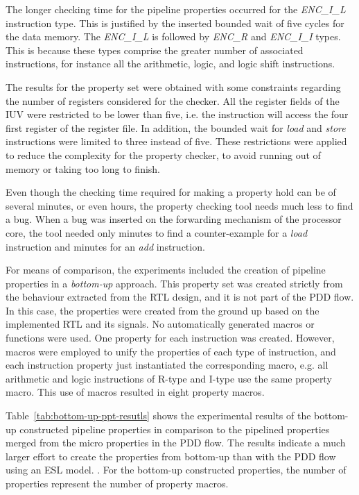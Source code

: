 The longer checking time for the pipeline properties occurred for the \textit{ENC\_I\_L} instruction type. This is justified by the inserted bounded wait of five cycles for the data memory. The \textit{ENC\_I\_L} is followed by \textit{ENC\_R} and \textit{ENC\_I\_I} types. This is because these types comprise the greater number of associated instructions, for instance all the arithmetic, logic, and logic shift instructions. 

The results for the \SSQED{} property set were obtained with some constraints regarding the number of registers considered for the checker. All the register fields of the IUV were restricted to be lower than five, i.e. the instruction will access the four first register of the register file. In addition, the bounded wait for \textit{load} and \textit{store} instructions were limited to three instead of five. These restrictions were applied to reduce the complexity for the property checker, to avoid running out of memory or taking too long to finish.

Even though the checking time required for making a property hold can be of several minutes, or even hours, the property checking tool needs much less to find a bug. When a bug was inserted on the forwarding mechanism of the processor core, the tool needed only  minutes to find a counter-example for a \textit{load} instruction and   minutes for an \textit{add} instruction.

For means of comparison, the experiments included the creation of pipeline properties in a \textit{bottom-up} approach. This property set was created strictly from the behaviour extracted from the RTL design, and it is not part of the PDD flow. In this case, the properties were created from the ground up based on the implemented RTL and its signals. No automatically generated macros or functions were used. One property for each instruction was created. However, macros were employed to unify the properties of each type of instruction, and each instruction property just instantiated the corresponding macro, e.g. all arithmetic and logic instructions of R-type and I-type use the same property macro. This use of macros resulted in eight property macros.

Table~\ref{tab:bottom-up-ppt-resutls} shows the experimental results of the bottom-up constructed pipeline properties in comparison to the pipelined properties merged from the micro properties in the PDD flow. The results indicate a much larger effort to create the properties from bottom-up than with the PDD flow using an ESL model. . For the bottom-up constructed properties, the number of properties represent the number of property macros. 

